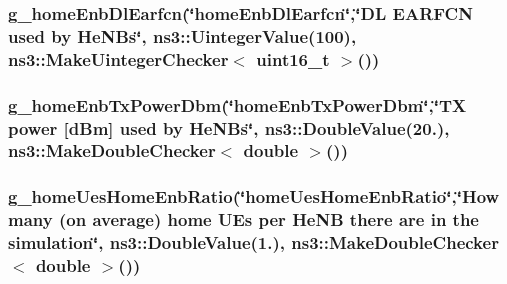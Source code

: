 \subsubsection[{\texorpdfstring{g\+\_\+home\+Enb\+Dl\+Earfcn}{g_homeEnbDlEarfcn}}]{ g\+\_\+home\+Enb\+Dl\+Earfcn(\char`\"{}home\+Enb\+Dl\+Earfcn\char`\"{},\char`\"{}{\bf DL} {\bf E\+A\+R\+F\+CN} used by He\+N\+Bs\char`\"{}, ns3\+::\+Uinteger\+Value(100), {\bf ns3\+::\+Make\+Uinteger\+Checker}$<$ uint16\+\_\+t $>$())\hspace{0.3cm}{\ttfamily [static]}}\hypertarget{lena-dual-stripe_8cc_ac59d22cf4584fa3b4eff06328c3e14a1}{}\label{lena-dual-stripe_8cc_ac59d22cf4584fa3b4eff06328c3e14a1}
\subsubsection[{\texorpdfstring{g\+\_\+home\+Enb\+Tx\+Power\+Dbm}{g_homeEnbTxPowerDbm}}]{ g\+\_\+home\+Enb\+Tx\+Power\+Dbm(\char`\"{}home\+Enb\+Tx\+Power\+Dbm\char`\"{},\char`\"{}TX power \mbox{[}{\bf d\+Bm}\mbox{]} used by He\+N\+Bs\char`\"{}, ns3\+::\+Double\+Value(20.), {\bf ns3\+::\+Make\+Double\+Checker}$<$ double $>$())\hspace{0.3cm}{\ttfamily [static]}}\hypertarget{lena-dual-stripe_8cc_a464ff82dace5224dac84c5c2909e4eef}{}\label{lena-dual-stripe_8cc_a464ff82dace5224dac84c5c2909e4eef}
\subsubsection[{\texorpdfstring{g\+\_\+home\+Ues\+Home\+Enb\+Ratio}{g_homeUesHomeEnbRatio}}]{ g\+\_\+home\+Ues\+Home\+Enb\+Ratio(\char`\"{}home\+Ues\+Home\+Enb\+Ratio\char`\"{},\char`\"{}How many ({\bf on} average) home U\+Es per He\+NB there are in the simulation\char`\"{}, ns3\+::\+Double\+Value(1.), {\bf ns3\+::\+Make\+Double\+Checker}$<$ double $>$())\hspace{0.3cm}{\ttfamily [static]}}\hypertarget{lena-dual-stripe_8cc_ae1c75341a2e656e0a04c131a12dad30d}{}\label{lena-dual-stripe_8cc_ae1c75341a2e656e0a04c131a12dad30d}
